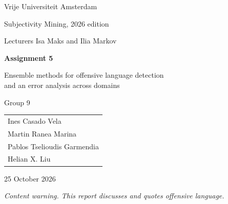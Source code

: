 \documentclass[11pt,a4paper]{article}
\begin{document}

\begin{titlepage}
    \centering
    \vspace*{2cm}

    {\Large Vrije Universiteit Amsterdam\par}
    \vspace{0.4cm}

    {\large Subjectivity Mining, 2026 edition\par}
    \vspace{0.2cm}

    {\large Lecturers Isa Maks and Ilia Markov\par}

    \vspace{3.5cm}

    {\huge\bfseries Assignment 5\par}
    \vspace{0.5cm}

    {\LARGE Ensemble methods for offensive language detection\\[0.2cm] and an error analysis across domains\par}

    \vspace{3cm}

    {\Large Group 9\par}
    \vspace{0.8cm}

    {\large
    \begin{tabular}{l}
        Ines Casado Vela \\
        Martin Ranea Marina \\
        Pablos Tselioudis Garmendia \\
        Helian X. Liu \\
    \end{tabular}\par}

    \vfill

    {\large 25 October 2026\par}

\end{titlepage}

\tableofcontents
\newpage

\noindent\textit{Content warning. This report discusses and quotes offensive language.}
\end{document}
